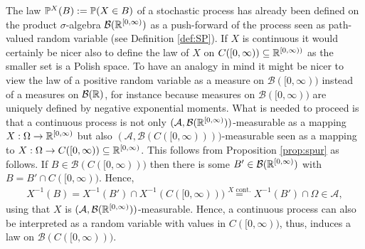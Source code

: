 The law $\P^X(B):=\P(X\in B)$ of a stochastic process has already been defined on the product $\sigma$-algebra $\mathcal B(\R^{[0,\infty)})$ as a push-forward of the process seen as path-valued random variable (see Definition \ref{def:SP}). If $X$ is continuous it would certainly be nicer also to define the law of $X$ on $C([0,\infty))\subseteq \R^{[0,\infty))}$ as the smaller set is a Polish space. To have an analogy in mind it might be nicer to view the law of a positive random variable as a measure on $\mathcal B([0,\infty))$ instead of a measures on $\mathcal B(\R)$, for instance because measures on $\mathcal B([0,\infty))$ are uniquely defined by negative exponential moments. What is needed to proceed is that a continuous process is not only $(\mathcal A, \mathcal B(\R^{[0,\infty)}))$-measurable as a mapping $X:\Omega\to \R^{[0,\infty)}$ but also $(\mathcal A, \mathcal B(C([0,\infty))))$-measurable seen as a mapping to $X:\Omega\to C([0,\infty))\subseteq \R^{[0,\infty)}$. This follows from Proposition \ref{prop:spur} as follows. If $B\in \mathcal B(C([0,\infty)))$ then there is some $B'\in \mathcal B(\R^{[0,\infty)})$ with $B=B'\cap C([0,\infty))$. Hence, 
\begin{align*}
	X^{-1}(B)=X^{-1}(B')\cap X^{-1}(C([0,\infty)))\overset{X\text{ cont.}}{=}X^{-1}(B')\cap \Omega\in \mathcal A,
\end{align*}
using that $X$ is $(\mathcal A, \mathcal B(\R^{[0,\infty)}))$-measurable. Hence, a continuous process can also be interpreted as a random variable with values in $C([0,\infty))$, thus, induces a law on $\mathcal B(C([0,\infty)))$.
